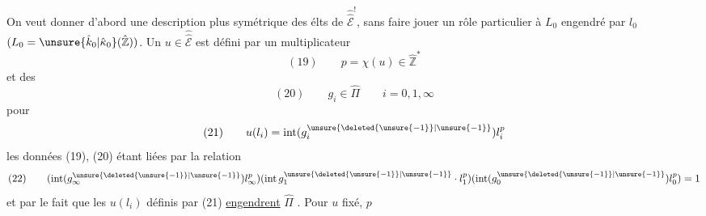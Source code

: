 On veut donner d'abord une description plus symétrique des élts de $\widehat{\widehat{\mathcal E}}^!$, sans faire jouer un rôle particulier à $L_0$ engendré par $l_0$ $(L_0=\unsure{\hat k_0|\hat\kappa_0}(\hat{\mathbb Z}))$. Un $u\in\widehat{\widehat{\mathcal E}}$ est  défini par un multiplicateur
\[
(19)\qquad p=\chi(u)\in\hat{\mathbb Z}^{*}
\]
et des
\[
(20)\qquad g_i\in\hat\Pi\qquad i=0,1,\infty
\]
pour
\[
(21)\qquad u(l_i)=\operatorname{int}(g_i^{\unsure{\deleted{\unsure{-1}}|\unsure{-1}}})l_i^p
\]
les données (19), (20) étant liées par la relation
\[
(22)\qquad(\operatorname{int}(g_\infty^{\unsure{\deleted{\unsure{-1}}|\unsure{-1}}})l_\infty^p)
(\operatorname{int}g_1^{\unsure{\deleted{\unsure{-1}}|\unsure{-1}}}\cdot l_1^p)
(\operatorname{int}(g_0^{\unsure{\deleted{\unsure{-1}}|\unsure{-1}}})l_0^p)=1
\]
et par le fait que les $u(l_i)$ définis par (21) \uline{engendrent} $\hat\Pi$ . Pour $u$ fixé, $p$
